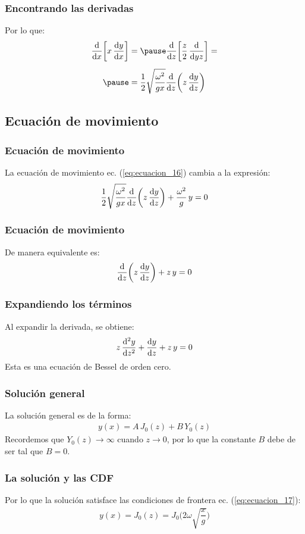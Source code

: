 \documentclass[12pt]{beamer}
\begin{document}
\begin{frame}
\frametitle{Encontrando las derivadas}
Por lo que:
\pause
\begin{eqnarray}
\begin{aligned}[b]
\dv{x} \bigg[x \, \dv{y}{x} \bigg] &= \pause \dv{z} \bigg[ \dfrac{z}{2} \, \dv{y{z}} \bigg] = \\[0.5em] \pause
&= \dfrac{1}{2} \sqrt{\dfrac{\omega^{2}}{g x}} \dv{z} \bigg( z \, \dv{y}{z} \bigg)
\end{aligned}
\label{eq:ecuacion_20}
\end{eqnarray}
\end{frame}

\subsection{Ecuación de movimiento}

\begin{frame}
\frametitle{Ecuación de movimiento}
La ecuación de movimiento ec. (\ref{eq:ecuacion_16}) cambia a la expresión:
\pause
\begin{align}
\dfrac{1}{2} \sqrt{\dfrac{\omega^{2}}{g x}} \dv{z} \bigg( z \, \dv{y}{z} \bigg) + \dfrac{\omega^{2}}{g} \, y = 0
\label{eq:ecuacion_21}
\end{align}
\end{frame}
\begin{frame}
\frametitle{Ecuación de movimiento}
De manera equivalente es:
\pause
\begin{align}
\dv{z} \bigg( z \, \dv{y}{z} \bigg) + z \, y = 0
\label{eq:ecuacion_22}
\end{align}
\end{frame}
\begin{frame}
\frametitle{Expandiendo los términos}
Al expandir la derivada, se obtiene:
\pause
\begin{align}
z \, \dv[2]{y}{z} + \dv{y}{z} + z \, y = 0
\label{eq:ecuacion_23}
\end{align}
\pause
Esta es una ecuación de Bessel de orden cero.
\end{frame}
\begin{frame}
\frametitle{Solución general}
La solución general es de la forma:
\pause
\begin{align*}
y (x) = A \, J_{0} (z) + B \, Y_{0} (z)
\end{align*}
\pause
Recordemos que $Y_{0} (z) \to \infty$ cuando $z \to 0$, por lo que la constante $B$ debe de ser tal que $B = 0$.
\end{frame}
\begin{frame}
\frametitle{La solución y las CDF}
Por lo que la solución satisface las condiciones de frontera ec. (\ref{eq:ecuacion_17}):
\pause
\begin{align}
y (x) = J_{0} (z) = J_{0} \bigg( 2 \omega \sqrt{\dfrac{x}{g}} \bigg)
\label{eq:ecuacion_24}
\end{align}
\end{frame}
\end{document}
